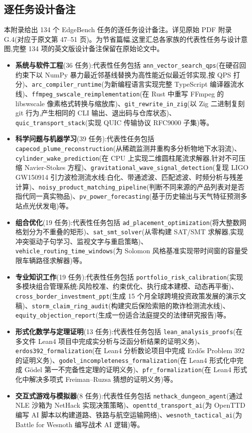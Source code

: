 \subsection{逐任务设计备注}
\label{app:per-task-notes}

本附录给出 134 个 EdgeBench 任务的逐任务设计备注。详见原始 PDF 附录 G.4(对应于原文第 47--51 页)。为节省篇幅,这里汇总各家族的代表性任务与设计意图,完整 134 项的英文版设计备注保留在原始论文中。

\begin{itemize}
    \item \textbf{系统与软件工程}(36 任务):代表性任务包括 \texttt{ann\_vector\_search\_qps}(在硬召回约束下以 NumPy 暴力最近邻基线替换为高性能近似最近邻实现,按 QPS 打分)、\texttt{arc\_compiler\_runtime}(为新编程语言实现完整 TypeScript 编译器流水线)、\texttt{ffmpeg\_swscale\_reimplementation}(在 Rust 中重写 FFmpeg 的 libswscale 像素格式转换与缩放库)、\texttt{git\_rewrite\_in\_zig}(以 Zig 二进制复刻 git 行为,产生相同的 CLI 输出、退出码与仓库状态)、\texttt{quic\_transport\_stack}(实现 QUIC 传输协议 RFC9000 子集)等。
    \item \textbf{科学问题与机器学习}(39 任务):代表性任务包括 \texttt{capecod\_plume\_reconstruction}(从稀疏监测井重构多分析物地下水羽流)、\texttt{cylinder\_wake\_prediction}(在 CPU 上实现二维圆柱尾流求解器,针对不可压缩 Navier-Stokes 方程)、\texttt{gravitational\_wave\_signal\_detection}(复现 LIGO GW150914 引力波检测流水线:白化、带通滤波、匹配滤波、时频分析与残差计算)、\texttt{noisy\_product\_matching\_pipeline}(判断不同来源的产品列表对是否指代同一真实物品)、\texttt{pv\_power\_forecasting}(基于历史输出与天气特征预测多站点光伏发电)等。
    \item \textbf{组合优化}(19 任务):代表性任务包括 \texttt{ad\_placement\_optimization}(将大整数网格划分为不重叠的矩形)、\texttt{sat\_smt\_solver}(从零构建 SAT/SMT 求解器,实现冲突驱动子句学习、监视文字与重启策略)、\texttt{vehicle\_routing\_time\_windows}(为 Solomon 风格基准实现带时间窗的容量受限车辆路径求解器)等。
    \item \textbf{专业知识工作}(19 任务):代表性任务包括 \texttt{portfolio\_risk\_calibration}(实现多模块组合管理系统:风险校准、约束优化、执行成本建模、动态再平衡)、\texttt{cross\_border\_investment\_ppt}(生成 15 个月全球跨境投资政策发展的演示文稿)、\texttt{storm\_claim\_ring\_audit}(构建灾后保险索赔的欺诈检测流水线)、\texttt{equity\_objection\_report}(生成一份适合法庭提交的法律研究报告)等。
    \item \textbf{形式化数学与定理证明}(13 任务):代表性任务包括 \texttt{lean\_analysis\_proofs}(在多文件 Lean4 项目中完成实分析与泛函分析结果的证明义务)、\texttt{erdos392\_formalization}(在 Lean4 分析数论项目中完成 Erdős Problem 392 的证明义务)、\texttt{godel\_incompleteness\_formalization}(在 Lean4 形式化中完成 Gödel 第一不完备性定理的证明义务)、\texttt{pfr\_formalization}(在 Lean4 形式化中解决多项式 Freiman--Ruzsa 猜想的证明义务)等。
    \item \textbf{交互式游戏与模拟器}(8 任务):代表性任务包括 \texttt{nethack\_dungeon\_agent}(通过 NLE 沙箱为 NetHack 实现决策策略)、\texttt{openttd\_transport\_ai}(为 OpenTTD 编写 AI 脚本以构建道路、铁路与航空运输网络)、\texttt{wesnoth\_tactical\_ai}(为 Battle for Wesnoth 编写战术 AI 逻辑)等。
\end{itemize}

